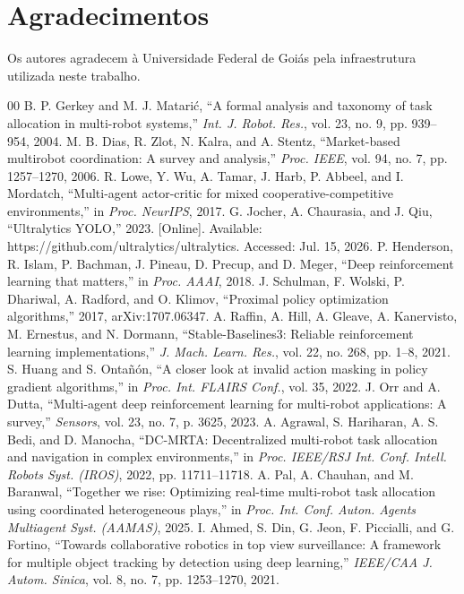 \documentclass[conference]{IEEEtran}
\begin{document}
\balance
\section*{Agradecimentos}
Os autores agradecem à Universidade Federal de Goiás pela infraestrutura utilizada neste trabalho.

\begin{thebibliography}{00}
 B. P. Gerkey and M. J. Matarić, ``A formal analysis and taxonomy of task allocation in multi-robot systems,'' \textit{Int. J. Robot. Res.}, vol. 23, no. 9, pp. 939--954, 2004.
 M. B. Dias, R. Zlot, N. Kalra, and A. Stentz, ``Market-based multirobot coordination: A survey and analysis,'' \textit{Proc. IEEE}, vol. 94, no. 7, pp. 1257--1270, 2006.
 R. Lowe, Y. Wu, A. Tamar, J. Harb, P. Abbeel, and I. Mordatch, ``Multi-agent actor-critic for mixed cooperative-competitive environments,'' in \textit{Proc. NeurIPS}, 2017.
 G. Jocher, A. Chaurasia, and J. Qiu, ``Ultralytics YOLO,'' 2023. [Online]. Available: https://github.com/ultralytics/ultralytics. Accessed: Jul. 15, 2026.
 P. Henderson, R. Islam, P. Bachman, J. Pineau, D. Precup, and D. Meger, ``Deep reinforcement learning that matters,'' in \textit{Proc. AAAI}, 2018.
 J. Schulman, F. Wolski, P. Dhariwal, A. Radford, and O. Klimov, ``Proximal policy optimization algorithms,'' 2017, arXiv:1707.06347.
 A. Raffin, A. Hill, A. Gleave, A. Kanervisto, M. Ernestus, and N. Dormann, ``Stable-Baselines3: Reliable reinforcement learning implementations,'' \textit{J. Mach. Learn. Res.}, vol. 22, no. 268, pp. 1--8, 2021.
 S. Huang and S. Ontañón, ``A closer look at invalid action masking in policy gradient algorithms,'' in \textit{Proc. Int. FLAIRS Conf.}, vol. 35, 2022.
 J. Orr and A. Dutta, ``Multi-agent deep reinforcement learning for multi-robot applications: A survey,'' \textit{Sensors}, vol. 23, no. 7, p. 3625, 2023.
 A. Agrawal, S. Hariharan, A. S. Bedi, and D. Manocha, ``DC-MRTA: Decentralized multi-robot task allocation and navigation in complex environments,'' in \textit{Proc. IEEE/RSJ Int. Conf. Intell. Robots Syst. (IROS)}, 2022, pp. 11711--11718.
 A. Pal, A. Chauhan, and M. Baranwal, ``Together we rise: Optimizing real-time multi-robot task allocation using coordinated heterogeneous plays,'' in \textit{Proc. Int. Conf. Auton. Agents Multiagent Syst. (AAMAS)}, 2025.
 I. Ahmed, S. Din, G. Jeon, F. Piccialli, and G. Fortino, ``Towards collaborative robotics in top view surveillance: A framework for multiple object tracking by detection using deep learning,'' \textit{IEEE/CAA J. Autom. Sinica}, vol. 8, no. 7, pp. 1253--1270, 2021.
\end{thebibliography}
\end{document}
